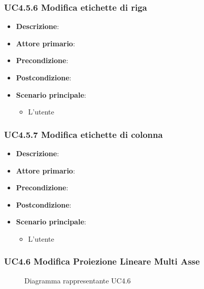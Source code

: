 \subsubsection{UC4.5.6 Modifica etichette di riga}
\label{ssub:uc4.5.6}
\begin{itemize}
    \item \textbf{Descrizione}:
    \item \textbf{Attore primario}:
    \item \textbf{Precondizione}:
    \item \textbf{Postcondizione}:
    \item \textbf{Scenario principale}:
    \begin{itemize}
        \item L'utente
    \end{itemize}
\end{itemize}

\subsubsection{UC4.5.7 Modifica etichette di colonna}
\label{ssub:uc4.5.7}
\begin{itemize}
    \item \textbf{Descrizione}:
    \item \textbf{Attore primario}:
    \item \textbf{Precondizione}:
    \item \textbf{Postcondizione}:
    \item \textbf{Scenario principale}:
    \begin{itemize}
        \item L'utente
    \end{itemize}
\end{itemize}

\newpage
\subsubsection{UC4.6 Modifica Proiezione Lineare Multi Asse}
\label{ssub:uc4.6}
\begin{figure}[h]
    \centering
    \caption{Diagramma rappresentante UC4.6}
    \label{fig:UC4.6}
\end{figure}

